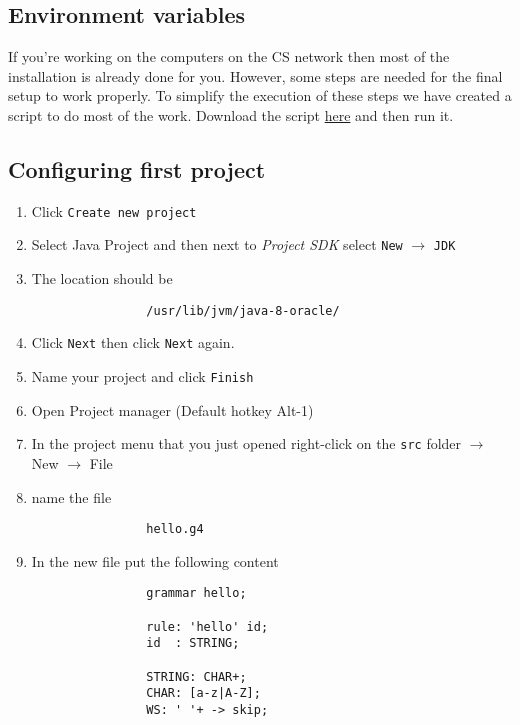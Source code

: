 \documentclass[../setup.tex]{subfiles}
\begin{document}
	\subsection{Environment variables}
		If you're working on the computers on the CS network then most of the installation is already done for you. However, some steps are needed for the final setup to work properly. To simplify
		the execution of these steps we have created a script to do most of the work. Download the script \href{static/setup_antlr.sh}{here} and
		then run it.

	\subsection{Configuring first project}
		\begin{enumerate}
			\item Click \texttt{Create new project}

			\item Select Java Project and then next to \textit{Project SDK} select \texttt{New} $\rightarrow$ \texttt{JDK}

			\item The location should be
			\begin{lstlisting}
				/usr/lib/jvm/java-8-oracle/
			\end{lstlisting}

			\item Click \texttt{Next} then click \texttt{Next} again.

			\item Name your project and click \texttt{Finish}

			\item Open Project manager (Default hotkey Alt-1)

			\item In the project menu that you just opened right-click on the \texttt{src} folder $\rightarrow$ New $\rightarrow$ File

			\item name the file
			\begin{lstlisting}
				hello.g4
			\end{lstlisting}

			\item In the new file put the following content
			\begin{lstlisting}
				grammar hello;

				rule: 'hello' id;
				id  : STRING;

				STRING: CHAR+;
				CHAR: [a-z|A-Z];
				WS: ' '+ -> skip;
			\end{lstlisting}


\end{enumerate}
\end{document}
